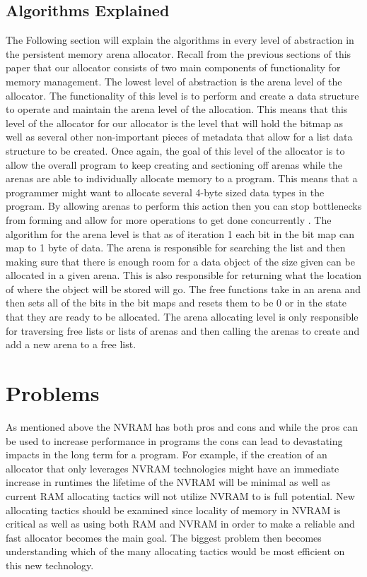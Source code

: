 \documentclass[conference]{IEEEtran}
\begin{document}
\subsection{Algorithms Explained}
The Following section will explain the algorithms in every level of abstraction in the persistent memory arena allocator. Recall from the previous sections of this paper that our allocator consists of two main components of functionality for memory management. The lowest level of abstraction is the arena level of the allocator. The functionality of this level is to perform and create a data structure to operate and maintain the arena level of the allocation. This means that this level of the allocator for our allocator is the level that will hold the bitmap as well as several other non-important pieces of metadata that allow for a list data structure to be created. Once again, the goal of this level of the allocator is to allow the overall program to keep creating and sectioning off arenas while the arenas are able to individually allocate memory to a program. This means that a programmer might want to allocate several 4-byte sized data types in the program. By allowing arenas to perform this action then you can stop bottlenecks from forming and allow for more operations to get done concurrently \cite{ScalableLock}. The algorithm for the arena level is that as of iteration 1 each bit in the bit map can map to 1 byte of data. The arena is responsible for searching the list and then making sure that there is enough room for a data object of the size given can be allocated in a given arena. This is also responsible for returning what the location of where the object will be stored will go. The free functions take in an arena and then sets all of the bits in the bit maps and resets them to be 0 or in the state that they are ready to be allocated. The arena allocating level is only responsible for traversing free lists or lists of arenas and then calling the arenas to create and add a new arena to a free list.  

\section{Problems}
As mentioned above the NVRAM has both pros and cons and while the pros can be used to increase performance in programs the cons can lead to devastating impacts in the long term for a program. For example, if the creation of an allocator that only leverages NVRAM technologies might have an immediate increase in runtimes the lifetime of the NVRAM will be minimal as well as current RAM allocating tactics will not utilize NVRAM to is full potential. New allocating tactics should be examined since locality of memory in NVRAM is critical as well as using both RAM and NVRAM in order to make a reliable and fast allocator becomes the main goal. The biggest problem then becomes understanding which of the many allocating tactics would be most efficient on this new technology. 
\end{document}
